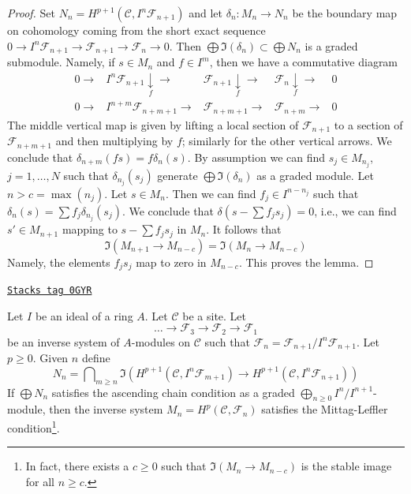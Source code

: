 \begin{proof}
Set $N_n = H^{p + 1}(\mathcal{C}, I^n\mathcal{F}_{n + 1})$ and let
$\delta_n : M_n \to N_n$ be the boundary map on cohomology
coming from the short exact sequence
$0 \to I^n\mathcal{F}_{n + 1} \to \mathcal{F}_{n + 1} \to \mathcal{F}_n \to 0$.
Then $\bigoplus \Im(\delta_n) \subset \bigoplus N_n$ is a graded submodule.
Namely, if $s \in M_n$ and $f \in I^m$, then we have a commutative diagram
$$
\begin{array}{ccccc}0 \longrightarrow & I^n\mathcal{F}_{n + 1} \underset{f}{\downarrow}\longrightarrow & \mathcal{F}_{n + 1} \underset{f}{\downarrow}\longrightarrow & \mathcal{F}_n \underset{f}{\downarrow}\longrightarrow & 0 \\ 0 \longrightarrow & I^{n + m}\mathcal{F}_{n + m + 1} \longrightarrow & \mathcal{F}_{n + m + 1} \longrightarrow & \mathcal{F}_{n + m} \longrightarrow & 0\end{array}
$$
The middle vertical map is given by lifting a local section of
$\mathcal{F}_{n + 1}$ to a section of $\mathcal{F}_{n + m + 1}$
and then multiplying by $f$; similarly for the other vertical arrows.
We conclude that $\delta_{n + m}(fs) = f \delta_n(s)$.
By assumption we can find $s_j \in M_{n_j}$, $j = 1, \ldots, N$
such that $\delta_{n_j}(s_j)$
generate $\bigoplus \Im(\delta_n)$ as a graded module. Let $n > c = \max(n_j)$.
Let $s \in M_n$. Then we can find $f_j \in I^{n - n_j}$ such that
$\delta_n(s) = \sum f_j \delta_{n_j}(s_j)$. We conclude that
$\delta(s - \sum f_j s_j) = 0$, i.e., we can find $s' \in M_{n + 1}$
mapping to $s - \sum f_js_j$ in $M_n$. It follows that
$$
\Im(M_{n + 1} \to M_{n - c}) = \Im(M_n \to M_{n - c})
$$
Namely, the elements $f_js_j$ map to zero in $M_{n - c}$.
This proves the lemma.
\end{proof}

\begin{lemma}
\label{sites-cohomology-lemma-ML-general-better}
\href{https://stacks.math.columbia.edu/tag/0GYR}{\texttt{Stacks tag 0GYR}}

Let $I$ be an ideal of a ring $A$. Let $\mathcal{C}$ be a site. Let
$$
\ldots \to \mathcal{F}_3 \to \mathcal{F}_2 \to \mathcal{F}_1
$$
be an inverse system of $A$-modules on $\mathcal{C}$
such that $\mathcal{F}_n = \mathcal{F}_{n + 1}/I^n\mathcal{F}_{n + 1}$.
Let $p \geq 0$. Given $n$ define
$$
N_n =
\bigcap\nolimits_{m \geq n}
\Im\left(
H^{p + 1}(\mathcal{C}, I^n\mathcal{F}_{m + 1}) \to
H^{p + 1}(\mathcal{C}, I^n\mathcal{F}_{n + 1})
\right)
$$
If $\bigoplus N_n$ satisfies the ascending chain condition as a graded
$\bigoplus_{n \geq 0} I^n/I^{n + 1}$-module, then the inverse system
$M_n = H^p(\mathcal{C}, \mathcal{F}_n)$ satisfies the Mittag-Leffler
condition\footnote{In fact, there exists
a $c \geq 0$ such that $\Im(M_n \to M_{n - c})$ is the stable image
for all $n \geq c$.}.
\end{lemma}

